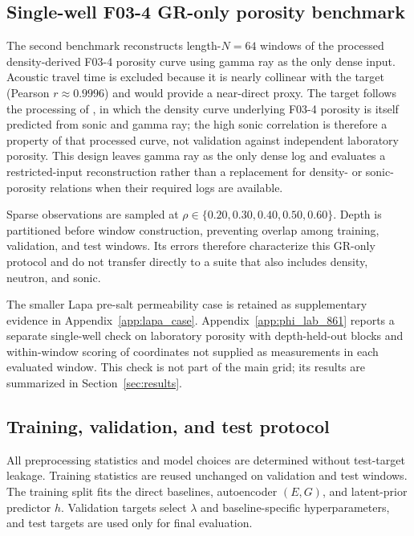 \subsection{Single-well F03-4 GR-only porosity benchmark}

The second benchmark reconstructs length-$N=64$ windows of the processed
density-derived F03-4 porosity curve using gamma ray as the only dense input.
Acoustic travel time is excluded because it is nearly collinear with the target
(Pearson $r\approx0.9996$) and would provide a near-direct proxy. The target
follows the processing of \citet{zhang2025rockphysicslogs}, in which the
density curve underlying F03-4 porosity is itself predicted from sonic and
gamma ray; the high sonic correlation is therefore a property of that
processed curve, not validation against independent laboratory porosity.
This design leaves gamma ray as the only dense log and evaluates a
restricted-input reconstruction rather than a replacement for density- or
sonic-porosity relations when their required logs are available.

Sparse observations are sampled at
$\rho\in\{0.20,0.30,0.40,0.50,0.60\}$. Depth is partitioned before window
construction, preventing overlap among training, validation, and test windows.
Its errors therefore characterize this GR-only protocol and do not transfer
directly to a suite that also includes density, neutron, and sonic.

The smaller Lapa pre-salt permeability case
\citep{alvarez2025nonlinear} is retained as supplementary evidence in
Appendix~\ref{app:lapa_case}. Appendix~\ref{app:phi_lab_861} reports a
separate single-well check on laboratory porosity with depth-held-out blocks
and within-window scoring of coordinates not supplied as measurements in each
evaluated window. This check is not part of the main grid; its results are
summarized in Section~\ref{sec:results}.

\subsection{Training, validation, and test protocol}
\label{subsec:train_val_test_protocol}

All preprocessing statistics and model choices are determined without
test-target leakage. Training statistics are reused unchanged on validation and
test windows. The training split fits the direct baselines, autoencoder $(E,G)$,
and latent-prior predictor $h$. Validation targets select $\lambda$ and
baseline-specific hyperparameters, and test targets are used only for final
evaluation.

